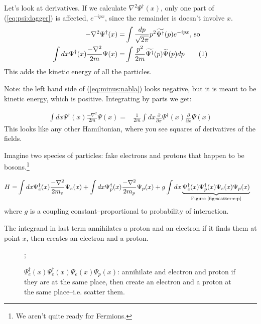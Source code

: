 \documentclass[]{article}
\newcommand\numberthis{\addtocounter{equation}{1}\tag{\theequation}}
\begin{document}
Let's look at derivatives. If we calculate $\nabla^2 \Psi^\dagger (x)$,  only one part of (\ref{eq:psi:dagger}) is affected, $e^{-ipx}$, since the remainder is doesn't involve $x$. 
\begin{align*}
	- \nabla^2 \Psi^\dagger (x) =& \int \frac{dp}{\sqrt{2\pi}} p^2 \widetilde{\Psi^\dagger}(p) e^{-ipx}\text{, so}\\
	\int dx \Psi^\dagger(x) \frac{- \nabla^2}{2m} \Psi(x)=& \int \frac{ p^2}{2m} \widetilde{\Psi^\dagger}(p) \widetilde{\Psi}(p) dp \numberthis \label{eq:minus:nabla}
\end{align*}
This adds the kinetic energy of all the particles.

Note: the left hand side of (\ref{eq:minus:nabla}) looks negative, but it is meant to be kinetic energy, which is positive. Integrating by parts we get:

\begin{align*}
	\int dx \Psi^\dagger(x) \frac{- \nabla^2}{2m} \Psi(x)=& \frac{1}{2m} \int dx \frac{\partial }{\partial x} \Psi^\dagger(x)  \frac{\partial }{\partial x} \Psi(x)
\end{align*}
This looks like any other Hamiltonian, where you see squares of derivatives of the fields. 

Imagine two species of particles: fake electrons and protons that happen to be bosons.\footnote{We aren't quite ready for Fermions.}

\begin{align*}
	H =& \int dx  \Psi^\dagger_e(x) \frac{- \nabla^2}{2m_e} \Psi_e(x) + \int dx \Psi^\dagger_p(x) \frac{- \nabla^2}{2m_p} \Psi_p(x)  + g \int dx \underbrace{\Psi^\dagger_e(x) \Psi^\dagger_p(x) \Psi_e(x) \Psi_p(x)}_\text{Figure \ref{fig:scatter:e:p}} 
\end{align*}
where $g$ is a coupling constant--proportional to probability of interaction. 

The integrand in last term annihilates a proton and an electron if it finds them at point $x$, then creates an electron and a proton.

\begin{figure}[H]
	\begin{center}
		\caption[$\Psi^\dagger_e(x) \Psi^\dagger_e(x) \Psi_e(x) \Psi_p(x)$--scattering]{$\Psi^\dagger_e(x) \Psi^\dagger_e(x) \Psi_e(x) \Psi_p(x)$: annihilate and electron and proton if they are at the same place, then create an electron and a proton at the same place--i.e. scatter them.}\label{fig:scatter:e:p}
		;
	\end{center}
\end{figure}
\end{document}
